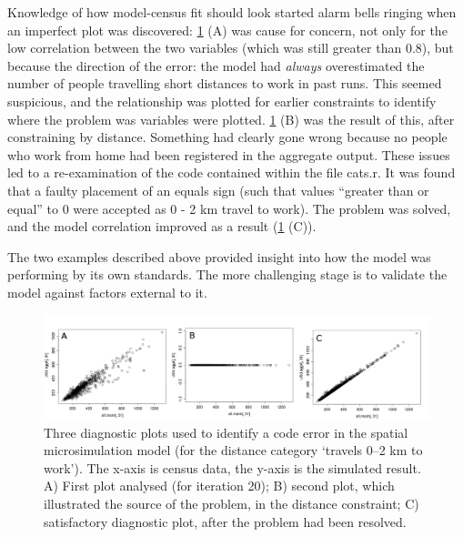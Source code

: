 \documentclass[a4paper, 11pt, twoside]{article}
\begin{document}
Knowledge of how model-census fit should look started alarm bells
ringing when an imperfect plot was discovered:
\cref{fig:error} (A) was cause for concern, not only for the low
correlation between the two variables (which was still greater than 0.8), but
because the direction of the error: the model had \emph{always} overestimated the
number of people travelling short distances to work in past runs.
This seemed suspicious, and the relationship was plotted for earlier constraints
to identify where the problem was variables were plotted.
\cref{fig:error} (B) was the
result of this, after constraining by distance.
Something had clearly gone wrong because no people who work
from home had been registered in the aggregate output. These issues led to
a re-examination of the code contained
within the file cats.r. It was found that a faulty placement of an
equals sign (such that values ``greater than or equal'' to 0 were accepted as 0
- 2 km travel to work). The problem was solved, and the model correlation
improved as a result (\cref{fig:error} (C)).

The two examples described above provided insight into how the model was
performing by its own standards. The more challenging stage is to validate
the model against factors external to it. %

\begin{figure}[h]
  \begin{center}
\includegraphics[width=15cm]{errors3-1}      \end{center}
 \caption[Diagnostic plots to identify model error]{Three diagnostic plots used
to identify a code error in the spatial microsimulation model (for the
distance category `travels 0--2 km to work'). The x-axis is
census data, the y-axis is the simulated result. A) First plot
analysed (for iteration 20); B) second plot, which illustrated the source of the
problem, in the distance constraint; C) satisfactory diagnostic plot,
after the problem had been resolved.}
 \label{fig:error}
\end{figure}
\end{document}
